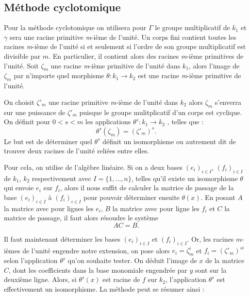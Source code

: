 \documentclass[a4paper]{article} %
\numberwithin{section}{part}
\numberwithin{equation}{section}
\newcommand\nroot[1]{\textit{#1}-ième}
\begin{document}
\subsection{Méthode cyclotomique}
Pour la méthode cyclotomique on utilisera pour $\Gamma$ le groupe multiplicatif 
de $k_1$ et $\gamma$ sera une racine primitive \nroot{m} de l'unité.
Un corps fini contient toutes les racines \nroot{m} de l'unité si et seulement 
si l'ordre de son groupe multiplicatif est divisible par $m$. En particulier, il
contient alors des racines \nroot{m} primitives de l'unité. Soit $\zeta_m$ une
racine \nroot{m} primitive de l'unité dans $k_1$, alors l'image de $\zeta_m$ par
n'importe quel morphisme $\theta : k_1 \to k_2$ est une racine \nroot{m} 
primitive de l'unité.\par
On choisit $\zeta'_m$ une racine primitive \nroot{m} de l'unité dans $k_2$
alors $\zeta_m$ s'enverra sur une puissance de $\zeta'_m$ puisque le groupe 
mulitplicatif d'un corps est cyclique. On définit pour $0 < s < m$ les
applications $\theta^s : k_1 \to k_2$ , telles que :
\begin{equation}
\theta^s(\zeta_m) = (\zeta'_m)^s.
\end{equation}
Le but est de déterminer quel $\theta^s$ définit un isomorphisme ou autrement
dit de trouver deux racines de l'unité reliées entre elles.\par
Pour cela, on utilise de l'algèbre linéaire. Si on a deux bases 
$(e_i)_{i\in I}$, $(f_i)_{i\in I}$ de $k_1$, $k_2$ respectivement avec $I =
\lbrace{1,\dots,n}\rbrace$, telles qu'il existe un isomorphisme $\theta$ qui 
envoie $e_i$ sur $f_i$, alors il nous suffit de calculer la matrice de passage 
de la base $(e_i)_{i\in I}$ à $(f_i)_{i\in I}$ pour pouvoir déterminer ensuite 
$\theta(x)$. En posant $A$ la matrice avec pour lignes les $e_i$, $B$ la matrice
avec pour ligne les $f_i$ et $C$ la matrice de passage, il faut alors résoudre 
le système 
\begin{equation}
AC = B.
\end{equation}
\par
Il faut maintenant déterminer les bases $(e_i)_{i\in I}$ et $(f_i)_{i\in I}$. 
Or, les racines $m$-ièmes de l'unité engendre notre extension, on pose alors 
$e_i = \zeta_m^i$ et $f_i = (\zeta'_m)^{si}$ selon l'application $\theta^s$ 
qu'on souhaite tester. On déduit l'image de $x$ de la matrice $C$, dont les 
coefficients dans la base monomiale engendrée par $y$ sont sur la deuxième 
ligne. Alors, si $\theta^s(x)$ est racine de $f$ sur $k_2$, l'application 
$\theta^s$ est effectivement un isomorphisme. La méthode peut se résumer ainsi :
\end{document}
